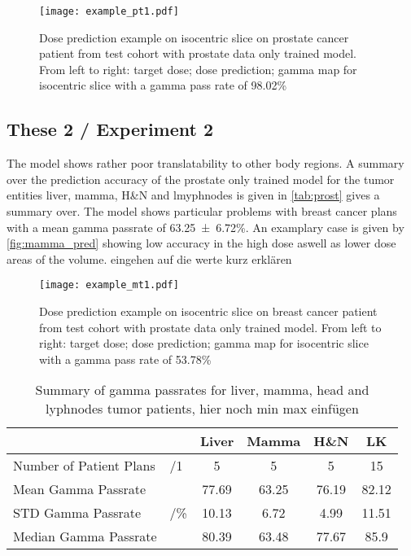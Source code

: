 \begin{figure}[ht]
    \centering
    \texttt{[image: example\_pt1.pdf]}
    \caption{Dose prediction example on isocentric slice on prostate cancer patient from test cohort with prostate data only trained model. From left to right: target dose; dose prediction; gamma map for isocentric slice with a gamma pass rate of 98.02\%}
    \label{fig:prediction}
\end{figure}

\subsection{These 2 / Experiment 2}

The model shows rather poor translatability to other body regions. A summary over the prediction accuracy of the prostate only trained model for the tumor entities liver, mamma, H\&N and lmyphnodes is given in \autoref{tab:prost} gives a summary over. The model shows particular problems with breast cancer plans with a mean gamma passrate of 63.25~±~6.72\%. An examplary case is given by \autoref{fig:mamma_pred} showing low accuracy in the high dose aswell as lower dose areas of the volume. eingehen auf die werte kurz erklären

\begin{figure}[ht]
    \centering
    \texttt{[image: example\_mt1.pdf]}
    \caption{Dose prediction example on isocentric slice on breast cancer patient from test cohort with prostate data only trained model. From left to right: target dose; dose prediction; gamma map for isocentric slice with a gamma pass rate of 53.78\%}
    \label{fig:mamma_pred}
\end{figure}

\begin{table}
    \centering
    \begin{tabular}{|ll|cccc|}
    \hline
                            &                      & \textbf{Liver} & \textbf{Mamma} & \textbf{H\&N} & \textbf{LK} \\ \hline
    Number of Patient Plans & /1                   & 5              & 5              & 5             & 15          \\ \cline{1-2}
    Mean Gamma Passrate     & \multirow{3}{*}{/\%} & 77.69          & 63.25          & 76.19         & 82.12       \\
    STD Gamma Passrate      &                      & 10.13          & 6.72           & 4.99          & 11.51       \\
    Median Gamma Passrate   &                      & 80.39          & 63.48          & 77.67         & 85.9        \\ \hline
    \end{tabular}
    \caption{Summary of gamma passrates for liver, mamma, head and lyphnodes tumor patients,  hier noch min max einfügen}
    \label{tab:prost}
\end{table}


